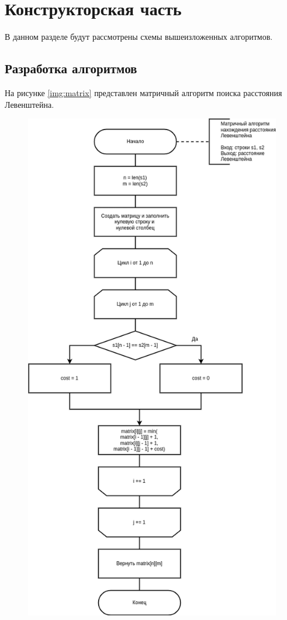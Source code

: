 \chapter{Конструкторская часть}

В данном разделе будут рассмотрены схемы вышеизложенных алгоритмов.

\section{Разработка алгоритмов}

На рисунке \ref{img:matrix} представлен матричный алгоритм поиска расстояния Левенштейна.

\begin{figure}[H]
	\begin{center}
		\includegraphics[scale=0.56]{img/matrix.png}

\end{center}
\end{figure}
